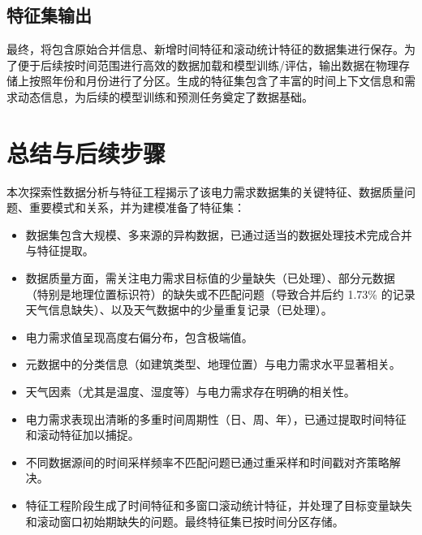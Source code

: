 \documentclass{article} %
\begin{document}
\subsection{特征集输出}
\label{subsec:fe_optimization_output}
最终，将包含原始合并信息、新增时间特征和滚动统计特征的数据集进行保存。为了便于后续按时间范围进行高效的数据加载和模型训练/评估，输出数据在物理存储上按照年份和月份进行了分区。生成的特征集包含了丰富的时间上下文信息和需求动态信息，为后续的模型训练和预测任务奠定了数据基础。

\section{总结与后续步骤}
\label{sec:conclusion}

本次探索性数据分析与特征工程揭示了该电力需求数据集的关键特征、数据质量问题、重要模式和关系，并为建模准备了特征集：
\begin{itemize}
    \item 数据集包含大规模、多来源的异构数据，已通过适当的数据处理技术完成合并与特征提取。
    \item 数据质量方面，需关注电力需求目标值的少量缺失（已处理）、部分元数据（特别是地理位置标识符）的缺失或不匹配问题（导致合并后约 1.73\% 的记录天气信息缺失）、以及天气数据中的少量重复记录（已处理）。
    \item 电力需求值呈现高度右偏分布，包含极端值。
    \item 元数据中的分类信息（如建筑类型、地理位置）与电力需求水平显著相关。
    \item 天气因素（尤其是温度、湿度等）与电力需求存在明确的相关性。
    \item 电力需求表现出清晰的多重时间周期性（日、周、年），已通过提取时间特征和滚动特征加以捕捉。
    \item 不同数据源间的时间采样频率不匹配问题已通过重采样和时间戳对齐策略解决。
    \item 特征工程阶段生成了时间特征和多窗口滚动统计特征，并处理了目标变量缺失和滚动窗口初始期缺失的问题。最终特征集已按时间分区存储。
\end{itemize}
\end{document}
